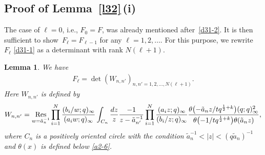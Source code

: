\documentclass[11pt]{article}
\numberwithin{equation}{section}
\numberwithin{equation}{section}
\newtheorem{Lemma}[Theorem]{Lemma}
\def\i{\infty}
\begin{document}
\subsection[Proof of Lemma 3.4 (i)]{Proof of Lemma~\ref{l32}\,(i)}
\label{s32}
 The case of $\ell=0$, i.e., $F_0=F$, was already mentioned after~\eqref{d31-2}.
 It is then sufficient to show~${F_{\ell}=F_{\ell-1}}$ for any $\ell=1,2,\dots$.
 For this purpose, we rewrite $F_{\ell}$ \eqref{d31-1} as a determinant with rank $N(\ell+ 1)$.
 \begin{Lemma}
 \label{l34}
 We have
 \begin{align}
 \label{3-12}
 F_{\ell}=\det\left(W_{n,n'}\right)_{n,n'=1,2,\dots,N(\ell+1)}.
 \end{align}
 Here $W_{n,n'}$ is defined by
 \begin{align}
\label{3-17}
 W_{n,n'}
 =
 \underset{w=\tilde{a}_{n}^{-1}}{\mathrm{Res}}
 \prod_{i=1}^N\frac{(b_i/w;q)_{\i}}{(a_i w;q)_{\i}}
 \int_{C_{n}}\frac{{\rm d}z}{z}
 \frac{-1}{z-\tilde{a}_{n'}^{-1}}
 \prod_{i=1}^N\frac{(a_i z;q)_{\i}}{(b_i/z;q)_{\i}}
 \frac{\theta\bigl(-\tilde{a}_{n}z/tq^{\frac12+k}\bigr)(q;q)_{\i}^2}{\theta\bigl(-1/tq^{\frac12+k}\bigr)\theta(\tilde{a}_n z)},
\end{align}
 where $C_n$ is a positively oriented circle with the condition $\tilde{a}_n^{-1}<|z|<(q\tilde{a}_n)^{-1}$ and $\theta(x)$ is defined below \eqref{a2-6}.
 \end{Lemma}
\end{document}

